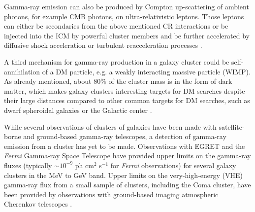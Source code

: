 \documentclass[12pt,manuscript]{aastex}
\def\Fermi{{\em Fermi}\xspace}
\begin{document}
Gamma-ray emission can also be produced by Compton up-scattering of ambient photons, for example
CMB photons, on ultra-relativistic leptons. Those leptons can either be secondaries from the above
mentioned CR interactions or be injected into the ICM by powerful cluster members and be further
accelerated by diffusive shock acceleration or turbulent reacceleration processes
\citep[][and references therein]{article:SchlickeiserSieversThiemann:1987}.

A third mechanism for gamma-ray production in a galaxy cluster could be self-annihilation of a DM
particle, e.g. a weakly interacting massive particle (WIMP). As already mentioned, about 80\% of
the cluster mass is in the form of dark matter, which makes galaxy clusters interesting targets for
DM searches \citep{article:EvansFerrerSarkar:2004, article:BergstromHooper:2006,
article:PinzkePfrommerBergstrom2009, article:Cuesta_etal:2011} despite their large distances
compared to other common targets for DM searches, such as dwarf spheroidal galaxies
\citep{article:Strigari_etal:2007, article:Acciari_etal:2010, article:Aliu_etal:2009} or the
Galactic center \citep{article:Kosack_etal:2004, article:Aharonian_etal:2006,
article:Aharonian_etal:2009b, article:Abramowski_etal:2011}. 

While several observations of clusters of galaxies have been made with satellite-borne and
ground-based gamma-ray telescopes, a detection of gamma-ray emission from a cluster has yet to be
made. Observations with EGRET \citep{article:Sreekumar_etal:1996, article:Reimer_etal:2003} and the
\Fermi Gamma-ray Space Telescope \citep{article:Ackermann_etal:2010} have provided upper limits on
the gamma-ray fluxes (typically $\sim10^{-9}$ ph cm$^{2}$ s$^{-1}$ for \Fermi observations) for
several galaxy clusters in the MeV to GeV band. Upper limits on the very-high-energy (VHE)
gamma-ray flux from a small sample of clusters, including the Coma cluster, have been provided by
observations with ground-based imaging atmospheric Cherenkov telescopes
\citep[IACTs;][]{article:Perkins_etal:2006, inproc:Perkins_etal:2008, article:Aharonian_etal:2009a,
article:Aleksic_etal:2010}.
\end{document}
